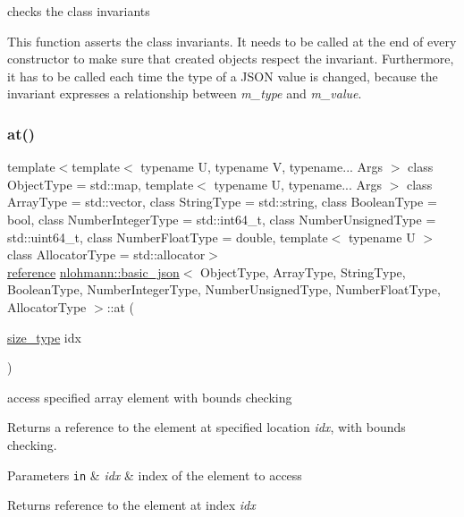 checks the class invariants 

This function asserts the class invariants. It needs to be called at the end of every constructor to make sure that created objects respect the invariant. Furthermore, it has to be called each time the type of a J\+S\+ON value is changed, because the invariant expresses a relationship between {\itshape m\+\_\+type} and {\itshape m\+\_\+value}. \hypertarget{classnlohmann_1_1basic__json_a214a8c22d616fd3567b88932c07436c9}{}\label{classnlohmann_1_1basic__json_a214a8c22d616fd3567b88932c07436c9} 
\subsubsection{\texorpdfstring{at()}{at()}\hspace{0.1cm}{\footnotesize\ttfamily [1/6]}}
{\footnotesize\ttfamily template$<$template$<$ typename U, typename V, typename... Args $>$ class Object\+Type = std\+::map, template$<$ typename U, typename... Args $>$ class Array\+Type = std\+::vector, class String\+Type  = std\+::string, class Boolean\+Type  = bool, class Number\+Integer\+Type  = std\+::int64\+\_\+t, class Number\+Unsigned\+Type  = std\+::uint64\+\_\+t, class Number\+Float\+Type  = double, template$<$ typename U $>$ class Allocator\+Type = std\+::allocator$>$ \\
\hyperlink{classnlohmann_1_1basic__json_a3ec8e17be8732fe436e9d6733f52b7a3}{reference} \hyperlink{classnlohmann_1_1basic__json}{nlohmann\+::basic\+\_\+json}$<$ Object\+Type, Array\+Type, String\+Type, Boolean\+Type, Number\+Integer\+Type, Number\+Unsigned\+Type, Number\+Float\+Type, Allocator\+Type $>$\+::at (\begin{DoxyParamCaption}\item[{\hyperlink{classnlohmann_1_1basic__json_a1579a8f72a230358d6cd1a6e8a62859b}{size\+\_\+type}}]{idx }\end{DoxyParamCaption})\hspace{0.3cm}{\ttfamily [inline]}}



access specified array element with bounds checking 

Returns a reference to the element at specified location {\itshape idx}, with bounds checking.


\begin{DoxyParams}[1]{Parameters}
\mbox{\tt in}  & {\em idx} & index of the element to access\\
\hline
\end{DoxyParams}
\begin{DoxyReturn}{Returns}
reference to the element at index {\itshape idx} 
\end{DoxyReturn}

